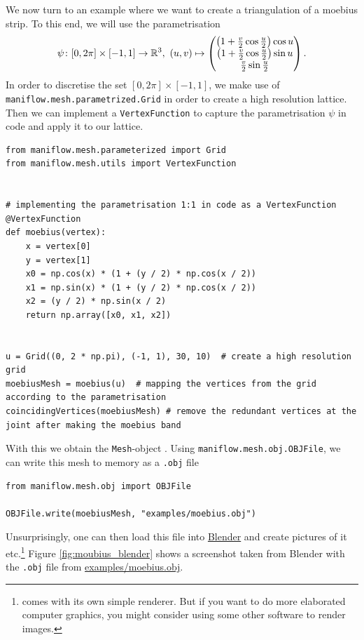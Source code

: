 \begin{ex}
We now turn to an example where we want to create a triangulation of a moebius strip. To this end, we will use the parametrisation
\begin{align*}
    \psi\colon [0, 2\pi]\times [-1,1]\to\R^3,\ (u,v)\mapsto\begin{pmatrix}
        \left(1+\frac{v}{2}\cos{\frac{u}{2}}\right)\cos{u}\\
        \left(1+\frac{v}{2}\cos{\frac{u}{2}}\right)\sin{u}\\
        \frac{v}{2}\sin{\frac{u}{2}}
    \end{pmatrix}.
\end{align*}
In order to discretise the set $[0,2\pi]\times[-1,1]$, we make use of \texttt{maniflow.mesh.parametrized.Grid} in order to create a high resolution lattice. Then we can implement a \texttt{VertexFunction} to capture the parametrisation $\psi$ in code and apply it to our lattice.
\begin{lstlisting}
from maniflow.mesh.parameterized import Grid
from maniflow.mesh.utils import VertexFunction


# implementing the parametrisation 1:1 in code as a VertexFunction
@VertexFunction
def moebius(vertex):
    x = vertex[0]
    y = vertex[1]
    x0 = np.cos(x) * (1 + (y / 2) * np.cos(x / 2))
    x1 = np.sin(x) * (1 + (y / 2) * np.cos(x / 2))
    x2 = (y / 2) * np.sin(x / 2)
    return np.array([x0, x1, x2])


u = Grid((0, 2 * np.pi), (-1, 1), 30, 10)  # create a high resolution grid
moebiusMesh = moebius(u)  # mapping the vertices from the grid according to the parametrisation
coincidingVertices(moebiusMesh) # remove the redundant vertices at the joint after making the moebius band
\end{lstlisting}
With this we obtain the \texttt{Mesh}-object . Using \texttt{maniflow.mesh.obj.OBJFile}, we can write this mesh to memory as a \texttt{.obj} file
\begin{lstlisting}
from maniflow.mesh.obj import OBJFile

OBJFile.write(moebiusMesh, "examples/moebius.obj")
\end{lstlisting}
Unsurprisingly, one can then load this file into \href{https://www.blender.org/}{Blender} and create pictures of it etc.\footnote{\maniflow{} comes with its own simple renderer. But if you want to do more elaborated computer graphics, you might consider using some other software to render images.} Figure \ref{fig:moubius_blender} shows a screenshot taken from Blender with the \texttt{.obj} file from \href{https://gitlab.gwdg.de/yangshan.xiang/scientific-computing/-/blob/82c42c864b3e46303b208b78720b8109116c78da/examples/moebius.obj}{\url{examples/moebius.obj}}.
\end{ex}
